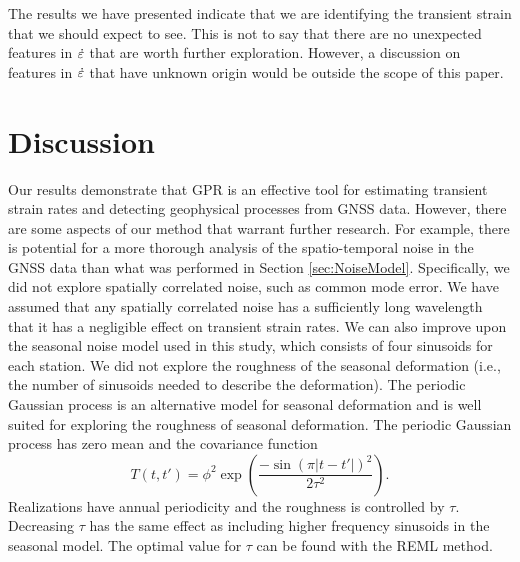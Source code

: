 \documentclass[extra,mreferee]{gji}
\begin{document}

The results we have presented indicate that we are identifying the
transient strain that we should expect to see. This is not to say that
there are no unexpected features in $\dot\varepsilon$ that are worth further
exploration. However, a discussion on features in $\dot\varepsilon$ that have
unknown origin would be outside the scope of this paper.

\section{Discussion}\label{sec:Discussion}


Our results demonstrate that GPR is an effective tool for estimating
transient strain rates and detecting geophysical processes from GNSS
data. However, there are some aspects of our method that warrant
further research. For example, there is potential for a more thorough
analysis of the spatio-temporal noise in the GNSS data than what was
performed in Section \ref{sec:NoiseModel}. Specifically, we did not
explore spatially correlated noise, such as common mode error. We
have assumed that any spatially correlated noise has a sufficiently
long wavelength that it has a negligible effect on transient strain
rates. We can also improve upon the seasonal noise model used in this
study, which consists of four sinusoids for each station. We did not
explore the roughness of the seasonal deformation (i.e., the number of
sinusoids needed to describe the deformation). The periodic Gaussian
process \citep{Mackay1998} is an alternative model for seasonal
deformation and is well suited for exploring the roughness of seasonal
deformation.  The periodic Gaussian process has zero mean and the
covariance function
\begin{equation}\label{eq:Periodic}
  T(t,t') = \phi^2 \exp\left(\frac{-\sin(\pi|t - t'|)^2}{2\tau^2}\right). 
\end{equation}
Realizations have annual periodicity and the roughness is controlled
by $\tau$. Decreasing $\tau$ has the same effect as including higher
frequency sinusoids in the seasonal model. The optimal value for
$\tau$ can be found with the REML method.

\end{document}
